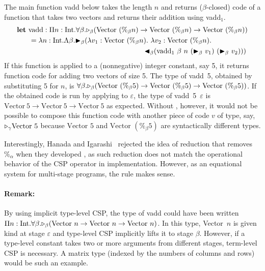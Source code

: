 The main function vadd below takes the length $n$ and returns
($\beta$-closed) code of a function that takes two vectors and returns
their addition using vadd$_1$.
\renewcommand{\Vpn}{\text{Vector}\ (\%_\beta n)}
\begin{align*}
	  & \textbf{let}\ \text{vadd}: \Pi n:\I.\F\beta.\TW_\beta(\Vpn\to\Vpn\to\Vpn)                \\ 
	  & \hspace{6mm} = \lambda n:\I.\Lambda\beta.\TB_\beta (\lambda v_1:\Vpn.\ \lambda v_2:\Vpn. \\
	  & \hspace{63mm} \TBL_\beta (\text{vadd}_1\ \beta\ n\ (\TB_\beta\ v_1)\ (\TB_\beta\ v_2))) 
\end{align*}
\renewcommand{\Vpn}{\text{Vector}\ (\%_\beta 5)}%
If this function is applied to a
(nonnegative) integer constant, say 5, it returns function code for adding
two vectors of size 5.  The type of vadd\ 5, obtained by
substituting 5 for $n$, is
$\F\beta.\TW_\beta(\Vpn\to\Vpn\to\Vpn)$.
\renewcommand{\Vpn}{\text{Vector}\ 5}
If the obtained code is run by applying to \(\varepsilon\),
the type of vadd\ 5\ $\varepsilon$ is
\(\Vpn\to\Vpn\to\Vpn\) as expected.
Without \QPercent, however, it would not be possible
to compose this function code with another piece of code
$v$ of type, say, \({\mathop{\triangleright}}_\gamma \text{Vector }5\) because
\(\text{Vector }5\) and \(\text{Vector }(\%_\beta 5)\) are
syntactically different types.

Interestingly, Hanada and Igarashi~\cite{Hanada2014} rejected the idea of
reduction that removes $\%_\alpha$ when they developed \LTP{}, as such
reduction does not match the operational behavior of the CSP operator
in implementation.  However, as an equational system for multi-stage
programs, the rule \QPercent makes sense.

\renewcommand{\Vpn}{\text{Vector}\ n}
\paragraph{Remark:} By using implicit type-level CSP, the type of vadd
could have been written
\(\Pi n:\I.\F\beta.\TW_\beta(\Vpn\to\Vpn\to\Vpn)\).  In this type,
Vector\ $n$ is given kind at stage \(\varepsilon\) and type-level CSP
implicitly lifts it to stage \(\beta\).  However, if a type-level
constant takes two or more arguments from different stages, term-level
CSP is necessary.  A matrix type (indexed by the numbers of columns
and rows) would be such an example.


